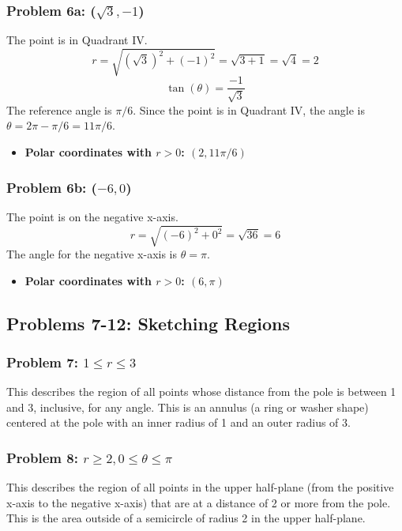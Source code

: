\documentclass{article}
\begin{document}
\subsubsection*{Problem 6a: (\(\sqrt{3}, -1\))}
The point is in Quadrant IV.
\[ r = \sqrt{(\sqrt{3})^2 + (-1)^2} = \sqrt{3 + 1} = \sqrt{4} = 2 \]
\[ \tan(\theta) = \frac{-1}{\sqrt{3}} \]
The reference angle is \(\pi/6\). Since the point is in Quadrant IV, the angle is \(\theta = 2\pi - \pi/6 = 11\pi/6\).

\begin{itemize}
    \item \textbf{Polar coordinates with \(r>0\): \((2, 11\pi/6)\)}
\end{itemize}

\subsubsection*{Problem 6b: (\(-6, 0\))}
The point is on the negative x-axis.
\[ r = \sqrt{(-6)^2 + 0^2} = \sqrt{36} = 6 \]
The angle for the negative x-axis is \(\theta = \pi\).

\begin{itemize}
    \item \textbf{Polar coordinates with \(r>0\): \((6, \pi)\)}
\end{itemize}

\subsection*{Problems 7-12: Sketching Regions}

\subsubsection*{Problem 7: \(1 \le r \le 3\)}
This describes the region of all points whose distance from the pole is between 1 and 3, inclusive, for any angle. This is an annulus (a ring or washer shape) centered at the pole with an inner radius of 1 and an outer radius of 3.

\subsubsection*{Problem 8: \(r \ge 2, 0 \le \theta \le \pi\)}
This describes the region of all points in the upper half-plane (from the positive x-axis to the negative x-axis) that are at a distance of 2 or more from the pole. This is the area outside of a semicircle of radius 2 in the upper half-plane.
\end{document}
